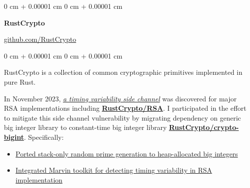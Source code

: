 \documentclass[10pt, letterpaper]{article}
\newenvironment{highlights}{
    \begin{itemize}[
        topsep=0.10 cm,
        parsep=0.10 cm,
        partopsep=0pt,
        itemsep=0pt,
        leftmargin=0 cm + 10pt
    ]
}{
    \end{itemize}
} %
\newenvironment{onecolentry}{
    \begin{adjustwidth}{
        0 cm + 0.00001 cm
    }{
        0 cm + 0.00001 cm
    }
}{
    \end{adjustwidth}
} %
\newenvironment{twocolentry}[2][]{
    \onecolentry
    \def\secondColumn{#2}
    \setcolumnwidth{\fill, 4.5 cm}
    \begin{paracol}{2}
}{
    \switchcolumn \raggedleft \secondColumn
    \end{paracol}
    \endonecolentry
} %
\begin{document}
        \begin{twocolentry}
            {\href{https://github.com/RustCrypto}{github.com/RustCrypto}}
            {\textbf{RustCrypto}}
        \end{twocolentry}
        \vspace{0.1cm}
        \begin{onecolentry}
            RustCrypto is a collection of common cryptographic primitives implemented in pure Rust.
            \vspace{0.1cm}

            In November 2023, \href{https://people.redhat.com/~hkario/marvin/}{\emph{a timing variability side channel}} was discovered for major RSA implementations including \href{https://github.com/RustCrypto/RSA}{\textbf{RustCrypto/RSA}}. I participated in the effort to mitigate this side channel vulnerability by migrating dependency on generic big integer library to constant-time big integer library \href{https://github.com/RustCrypto/crypto-bigint}{\textbf{RustCrypto/crypto-bigint}}. Specifically:

            \begin{highlights}
                \item \href{https://github.com/entropyxyz/crypto-primes/pull/40}{Ported stack-only random prime generation to heap-allocated big integers}
                \item \href{https://github.com/RustCrypto/RSA/pull/400}{Integrated Marvin toolkit for detecting timing variability in RSA implementation} 
            \end{highlights}
        \end{onecolentry}
        \vspace{0.3cm}

\end{document}
